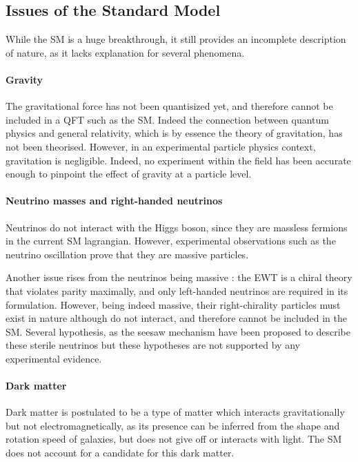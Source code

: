 \subsection{Issues of the Standard Model}
\label{sec:SM_limits}

While the SM is a huge breakthrough, it still provides an incomplete description of nature, as it lacks explanation for several phenomena. 

\paragraph{Gravity} The gravitational force has not been quantisized yet, and therefore cannot be included in a QFT such as the SM. Indeed the connection between quantum physics and general relativity, which is by essence the theory of gravitation, has not been theorised. However, in an experimental particle physics context, gravitation is negligible. Indeed, no experiment within the field has been accurate enough to pinpoint the effect of gravity at a particle level.

\paragraph{Neutrino masses and right-handed neutrinos} Neutrinos do not interact with the Higgs boson, since they are massless fermions in the current SM lagrangian. However, experimental observations such as the neutrino oscillation \cite{PhysRevLett.81.1562,PhysRevLett.89.011301} prove that they are massive particles.

Another issue rises from the neutrinos being massive : the EWT is a chiral theory that violates parity maximally, and only left-handed neutrinos are required in its formulation. However, being indeed massive, their right-chirality particles must exist in nature although do not interact, and therefore cannot be included in the SM. Several hypothesis, as the seesaw mechanism \cite{PhysRevD.22.2227,PhysRevLett.60.1813,PhysRevD.23.165,PhysRevLett.44.912,GellMann:1980vs,MINKOWSKI1977421} have been proposed to describe these sterile neutrinos but these hypotheses are not supported by any experimental evidence.

\paragraph{Dark matter} Dark matter is postulated to be a type of matter which interacts gravitationally but not electromagnetically, as its presence can be inferred from the shape and rotation speed of galaxies, but does not give off or interacts with light. The SM does not account for a candidate for this dark matter.

